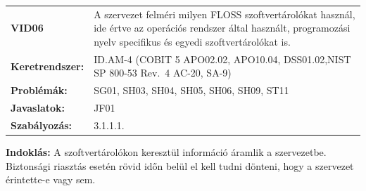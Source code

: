 \documentclass[12pt,magyar,a4paper,oneside]{scrreprt}
\begin{document}
\begin{longtable}[]{@{}ll@{}}
\toprule
\endhead
\begin{minipage}[t]{0.16\columnwidth}\raggedright
\textbf{VID06}\strut
\end{minipage} & \begin{minipage}[t]{0.79\columnwidth}\raggedright
A szervezet felméri milyen FLOSS szoftvertárolókat használ, ide értve az
operációs rendszer által használt, programozási nyelv specifikus és
egyedi szoftvertárolókat is.\strut
\end{minipage}\tabularnewline
\begin{minipage}[t]{0.16\columnwidth}\raggedright
\textbf{Keretrendszer:}\strut
\end{minipage} & \begin{minipage}[t]{0.79\columnwidth}\raggedright
ID.AM-4 (COBIT 5 APO02.02, APO10.04, DSS01.02,NIST SP 800-53 Rev.~4
AC-20, SA-9)\strut
\end{minipage}\tabularnewline
\begin{minipage}[t]{0.16\columnwidth}\raggedright
\textbf{Problémák:}\strut
\end{minipage} & \begin{minipage}[t]{0.79\columnwidth}\raggedright
SG01, SH03, SH04, SH05, SH06, SH09, ST11\strut
\end{minipage}\tabularnewline
\begin{minipage}[t]{0.16\columnwidth}\raggedright
\textbf{Javaslatok:}\strut
\end{minipage} & \begin{minipage}[t]{0.79\columnwidth}\raggedright
JF01\strut
\end{minipage}\tabularnewline
\begin{minipage}[t]{0.16\columnwidth}\raggedright
\textbf{Szabályozás:}\strut
\end{minipage} & \begin{minipage}[t]{0.79\columnwidth}\raggedright
3.1.1.1.\strut
\end{minipage}\tabularnewline
\bottomrule
\end{longtable}

\textbf{Indoklás: } A szoftvertárolókon keresztül információ áramlik a
szervezetbe. Biztonsági riasztás esetén rövid időn belül el kell tudni
dönteni, hogy a szervezet érintette-e vagy sem.
\end{document}
